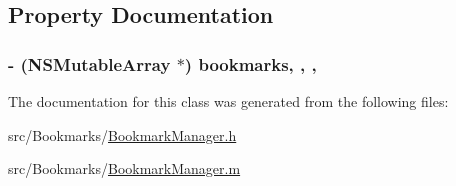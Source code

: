\subsection{Property Documentation}
\hypertarget{interface_bookmark_manager_aa476c46dac9eb059308b6cfc593bc9a4}{
\subsubsection[{bookmarks}]{\setlength{\rightskip}{0pt plus 5cm}-\/ (N\-S\-Mutable\-Array $\ast$) bookmarks\hspace{0.3cm}{\ttfamily [read]}, {\ttfamily [write]}, {\ttfamily [atomic]}, {\ttfamily [retain]}}}\label{interface_bookmark_manager_aa476c46dac9eb059308b6cfc593bc9a4}


The documentation for this class was generated from the following files\-:\begin{DoxyCompactItemize}
\item 
src/\-Bookmarks/\hyperlink{_bookmark_manager_8h}{Bookmark\-Manager.\-h}\item 
src/\-Bookmarks/\hyperlink{_bookmark_manager_8m}{Bookmark\-Manager.\-m}\end{DoxyCompactItemize}
